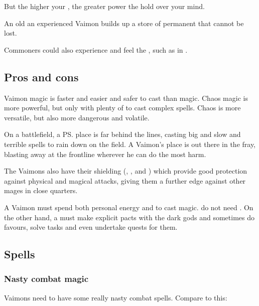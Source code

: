 But the higher your \shechinah{}, the greater power the \Archons{} hold over your mind. 

An old an experienced Vaimon builds up a store of permanent \shechinah{} that cannot be lost. 

Commoners could also experience and feel the \shechinah, such as in . 









\subsection{Pros and cons}
Vaimon magic is faster and easier and safer to cast than \rethyactic{} magic. 
Chaos magic is more powerful, but only with plenty of  to cast complex spells. 
Chaos is more versatile, but also more dangerous and volatile. 

On a battlefield, a \rethyactic{} \ps{\ishrah} place is far behind the lines, casting big and slow and terrible spells to rain down on the field. 
A Vaimon's place is out there in the fray, blasting away at the frontline wherever he can do the most harm. 

The Vaimons also have their shielding \sephiroth{} (\Barion, \Hoshied, \Teshiron{} and \Yeziel) which provide good protection against physical and magical attacks, giving them a further edge against other mages in close quarters. 

A Vaimon must spend both personal energy and \shechinah{} to cast magic. 
\Rethyaxes{} do not need \shechinah. 
On the other hand, a \rethyax{} must make explicit pacts with the dark gods and sometimes do favours, solve tasks and even undertake quests for them. 









\subsection{Spells}





\subsubsection{Nasty combat magic}
Vaimons need to have some really nasty combat spells. 
Compare to this:

